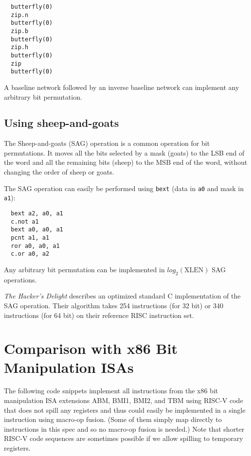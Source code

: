 \begin{verbatim}
  butterfly(0)
  zip.n
  butterfly(0)
  zip.b
  butterfly(0)
  zip.h
  butterfly(0)
  zip
  butterfly(0)
\end{verbatim}

A baseline network followed by an inverse baseline network can implement
any arbitrary bit permutation.


\subsection{Using sheep-and-goats}

The Sheep-and-goats (SAG) operation is a common operation for bit permutations.
It moves all the bits selected by a mask (goats) to the LSB end of the word
and all the remaining bits (sheep) to the MSB end of the word, without changing
the order of sheep or goats.

The SAG operation can easily be performed using {\tt bext} (data in {\tt a0} and
mask in {\tt a1}):

\begin{verbatim}
  bext a2, a0, a1
  c.not a1
  bext a0, a0, a1
  pcnt a1, a1
  ror a0, a0, a1
  c.or a0, a2
\end{verbatim}

Any arbitrary bit permutation can be implemented in $log_2(\textrm{XLEN})$ SAG
operations.

{\it The Hacker's Delight} describes an optimized standard C implementation of
the SAG operation. Their algorithm takes 254 instructions (for 32 bit) or 340
instructions (for 64 bit) on their reference RISC instruction
set.~\cite[p.~152f,~162f]{Seander05}


\section{Comparison with x86 Bit Manipulation ISAs}
\label{x86comp}

The following code snippets implement all instructions from the x86 bit manipulation
ISA extensions ABM, BMI1, BMI2, and TBM using RISC-V code that does not spill any
registers and thus could easily be implemented in a single instruction using macro-op
fusion. (Some of them simply map directly to instructions in this spec and so no
macro-op fusion is needed.) Note that shorter RISC-V code sequences are
sometimes possible if we allow spilling to temporary registers.

